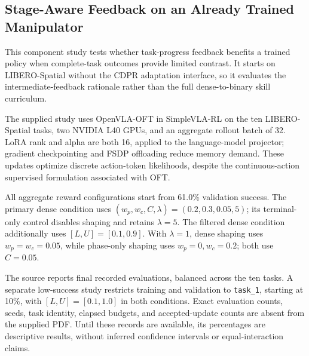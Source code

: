 \subsection{Stage-Aware Feedback on an Already Trained Manipulator}\label{sec:libero_setup}
This component study tests whether task-progress feedback benefits a trained policy when complete-task outcomes provide limited contrast. It starts on LIBERO-Spatial without the CDPR adaptation interface, so it evaluates the intermediate-feedback rationale rather than the full dense-to-binary skill curriculum.

The supplied study uses OpenVLA-OFT in SimpleVLA-RL on the ten LIBERO-Spatial tasks, two NVIDIA L40 GPUs, and an aggregate rollout batch of 32. LoRA rank and alpha are both 16, applied to the language-model projector; gradient checkpointing and FSDP offloading reduce memory demand. These updates optimize discrete action-token likelihoods, despite the continuous-action supervised formulation associated with OFT. 

All aggregate reward configurations start from 61.0\% validation success. The primary dense condition uses $(w_p,w_c,C,\lambda)=(0.2,0.3,0.05,5)$; its terminal-only control disables shaping and retains $\lambda=5$. The filtered dense condition additionally uses $[L,U]=[0.1,0.9]$. With $\lambda=1$, dense shaping uses $w_p=w_c=0.05$, while phase-only shaping uses $w_p=0,w_c=0.2$; both use $C=0.05$.

The source reports final recorded evaluations, balanced across the ten tasks. A separate low-success study restricts training and validation to \texttt{task\_1}, starting at 10\%, with $[L,U]=[0.1,1.0]$ in both conditions. Exact evaluation counts, seeds, task identity, elapsed budgets, and accepted-update counts are absent from the supplied PDF. Until these records are available, its percentages are descriptive results, without inferred confidence intervals or equal-interaction claims.


